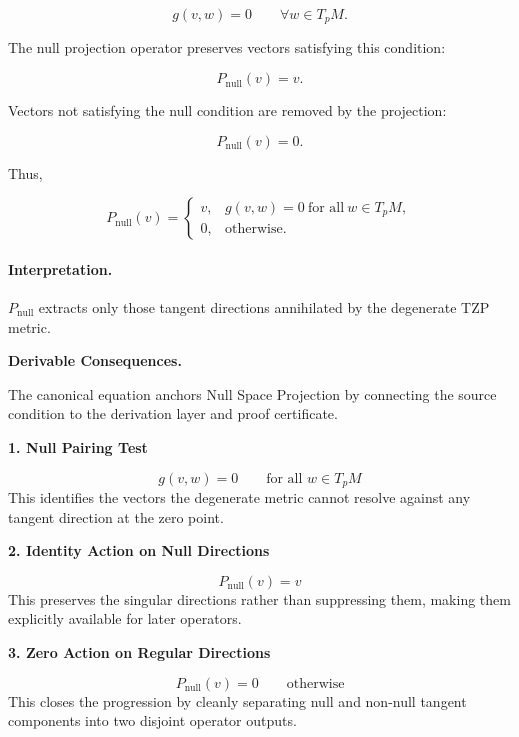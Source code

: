 \begin{equation}
g(v,w)=0
\qquad
\forall w\in T_pM .
\end{equation}

The null projection operator preserves vectors satisfying this condition:

\begin{equation}
P_{\mathrm{null}}(v)=v .
\end{equation}

Vectors not satisfying the null condition are removed by the projection:

\begin{equation}
P_{\mathrm{null}}(v)=0 .
\end{equation}

Thus,

\begin{equation}
\boxed{
P_{\mathrm{null}}(v)
=
\begin{cases}
v, & g(v,w)=0\ \text{for all}\ w\in T_pM,\\
0, & \text{otherwise}.
\end{cases}
}
\end{equation}

\paragraph{Interpretation.}
$P_{\mathrm{null}}$ extracts only those tangent directions annihilated by the degenerate TZP metric.

\par\vspace{0.35em}
\noindent\textbf{Derivable Consequences.}\quad
\begingroup
\footnotesize
\raggedright
The canonical equation anchors Null Space Projection by connecting the source condition to the derivation layer and proof certificate.
\par\endgroup

\noindent\textbf{1. Null Pairing Test}\par
\[
g(v,w)=0 \qquad \text{for all } w \in T_{p}M
\]
\noindent This identifies the vectors the degenerate metric cannot resolve against any tangent direction at the zero point.\par
\noindent\textbf{2. Identity Action on Null Directions}\par
\[
P_{\mathrm{null}}(v)=v
\]
\noindent This preserves the singular directions rather than suppressing them, making them explicitly available for later operators.\par
\noindent\textbf{3. Zero Action on Regular Directions}\par
\[
P_{\mathrm{null}}(v)=0 \qquad \text{otherwise}
\]
\noindent This closes the progression by cleanly separating null and non-null tangent components into two disjoint operator outputs.\par

